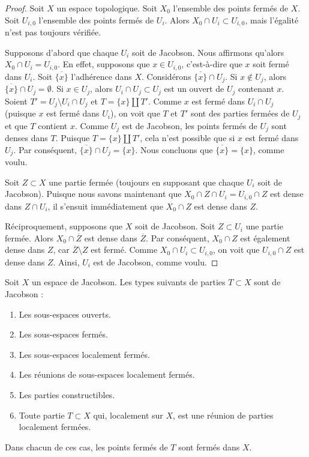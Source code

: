 \begin{proof}
Soit $X$ un espace topologique.
Soit $X_0$ l'ensemble des points fermés de $X$.
Soit $U_{i, 0}$ l'ensemble des points fermés de
$U_i$. Alors $X_0 \cap U_i \subset U_{i, 0}$,
mais l'égalité n'est pas toujours vérifiée.

\medskip\noindent
Supposons d'abord que chaque $U_i$ soit de Jacobson.
Nous affirmons qu'alors $X_0 \cap U_i = U_{i, 0}$.
En effet, supposons que $x \in U_{i, 0}$, c'est-à-dire que $x$ soit fermé dans
$U_i$. Soit $\overline{\{x\}}$ l'adhérence
dans $X$. Considérons $\overline{\{x\}} \cap U_j$.
Si $x \not \in U_j$, alors $\overline{\{x\}} \cap U_j = \emptyset$.
Si $x \in U_j$, alors $U_i \cap U_j \subset U_j$
est un ouvert de $U_j$ contenant $x$.
Soient $T' = U_j \setminus U_i \cap U_j$ et
$T = \{x\} \amalg T'$. Comme $x$ est fermé dans $U_i \cap U_j$
(puisque $x$ est fermé dans $U_i$), on voit que $T$ et $T'$
sont des parties fermées de $U_j$ et que $T$ contient
$x$. Comme $U_j$ est de Jacobson, les points fermés de
$U_j$ sont denses dans $T$. Puisque $T = \{x\} \amalg T'$,
cela n'est possible que si $x$ est fermé dans $U_j$.
Par conséquent, $\overline{\{x\}} \cap U_j = \{x\}$. Nous concluons
que $\overline{\{x\}} = \{ x \}$, comme voulu.

\medskip\noindent
Soit $Z \subset X$ une partie fermée (toujours
en supposant que chaque $U_i$ soit de Jacobson).
Puisque nous savons maintenant que $X_0 \cap Z  \cap U_i
= U_{i, 0} \cap Z$ est dense dans $Z \cap U_i$,
il s'ensuit immédiatement que $X_0 \cap Z$ est
dense dans $Z$.

\medskip\noindent
Réciproquement, supposons que $X$ soit de Jacobson.
Soit $Z \subset U_i$ une partie fermée. Alors
$X_0 \cap \overline{Z}$ est dense dans $\overline{Z}$.
Par conséquent, $X_0 \cap Z$ est également dense dans $Z$, car
$\overline{Z} \setminus Z$ est fermé. Comme $X_0 \cap U_i
\subset U_{i, 0}$, on voit que
$U_{i, 0} \cap Z$ est dense dans $Z$.
Ainsi, $U_i$ est de Jacobson, comme voulu.
\end{proof}

\begin{lemma}
\label{lemma-jacobson-inherited}
Soit $X$ un espace de Jacobson. Les types suivants de parties $T \subset X$
sont de Jacobson :
\begin{enumerate}
\item Les sous-espaces ouverts.
\item Les sous-espaces fermés.
\item Les sous-espaces localement fermés.
\item Les réunions de sous-espaces localement fermés.
\item Les parties constructibles.
\item Toute partie $T \subset X$ qui, localement sur $X$,
est une réunion de parties localement fermées.
\end{enumerate}
Dans chacun de ces cas, les points fermés de $T$ sont
fermés dans $X$.
\end{lemma}

